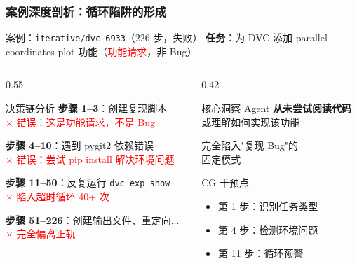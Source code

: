 \documentclass[aspectratio=169,10pt]{beamer}
\begin{document}
\begin{frame}
  \frametitle{案例深度剖析：循环陷阱的形成}

  \begin{block}{案例：\texttt{iterative/dvc-6933}（226 步，失败）}
    \textbf{任务}：为 DVC 添加 parallel coordinates plot 功能（\textcolor{red}{功能请求}，非 Bug）
  \end{block}

  \begin{columns}[T]
    \begin{column}{0.55\textwidth}
      \begin{block}{决策链分析}
        \scriptsize
        \textbf{步骤 1--3}：创建复现脚本\\
        \textcolor{red}{$\times$ 错误：这是功能请求，不是 Bug}

        \vspace{0.1cm}
        \textbf{步骤 4--10}：遇到 pygit2 依赖错误\\
        \textcolor{red}{$\times$ 错误：尝试 pip install 解决环境问题}

        \vspace{0.1cm}
        \textbf{步骤 11--50}：反复运行 \texttt{dvc exp show}\\
        \textcolor{red}{$\times$ 陷入超时循环 40+ 次}

        \vspace{0.1cm}
        \textbf{步骤 51--226}：创建输出文件、重定向...\\
        \textcolor{red}{$\times$ 完全偏离正轨}
      \end{block}
    \end{column}

    \begin{column}{0.42\textwidth}
      \begin{alertblock}{核心洞察}
        Agent \textbf{从未尝试阅读代码}\\或理解如何实现该功能

        \vspace{0.2cm}
        完全陷入"复现 Bug"的\\固定模式
      \end{alertblock}

      \begin{block}{CG 干预点}
        \begin{itemize}
          \item 第 1 步：识别任务类型
          \item 第 4 步：检测环境问题
          \item 第 11 步：循环预警
        \end{itemize}
      \end{block}
    \end{column}
  \end{columns}
\end{frame}
\end{document}
